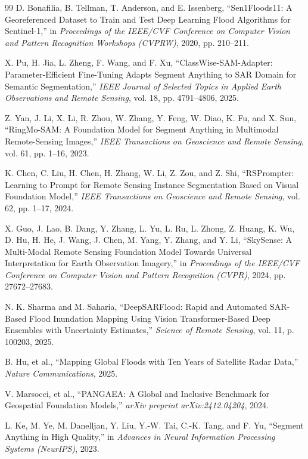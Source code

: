\documentclass[11pt,a4paper,oneside]{report}
\begin{document}
\begin{thebibliography}{99}
D. Bonafilia, B. Tellman, T. Anderson, and E. Issenberg, ``Sen1Floods11: A Georeferenced Dataset to Train and Test Deep Learning Flood Algorithms for Sentinel-1,'' in \emph{Proceedings of the IEEE/CVF Conference on Computer Vision and Pattern Recognition Workshops (CVPRW)}, 2020, pp. 210--211.

X. Pu, H. Jia, L. Zheng, F. Wang, and F. Xu, ``ClassWise-SAM-Adapter: Parameter-Efficient Fine-Tuning Adapts Segment Anything to SAR Domain for Semantic Segmentation,'' \emph{IEEE Journal of Selected Topics in Applied Earth Observations and Remote Sensing}, vol. 18, pp. 4791--4806, 2025.

Z. Yan, J. Li, X. Li, R. Zhou, W. Zhang, Y. Feng, W. Diao, K. Fu, and X. Sun, ``RingMo-SAM: A Foundation Model for Segment Anything in Multimodal Remote-Sensing Images,'' \emph{IEEE Transactions on Geoscience and Remote Sensing}, vol. 61, pp. 1--16, 2023.

K. Chen, C. Liu, H. Chen, H. Zhang, W. Li, Z. Zou, and Z. Shi, ``RSPrompter: Learning to Prompt for Remote Sensing Instance Segmentation Based on Visual Foundation Model,'' \emph{IEEE Transactions on Geoscience and Remote Sensing}, vol. 62, pp. 1--17, 2024.

X. Guo, J. Lao, B. Dang, Y. Zhang, L. Yu, L. Ru, L. Zhong, Z. Huang, K. Wu, D. Hu, H. He, J. Wang, J. Chen, M. Yang, Y. Zhang, and Y. Li, ``SkySense: A Multi-Modal Remote Sensing Foundation Model Towards Universal Interpretation for Earth Observation Imagery,'' in \emph{Proceedings of the IEEE/CVF Conference on Computer Vision and Pattern Recognition (CVPR)}, 2024, pp. 27672--27683.

N. K. Sharma and M. Saharia, ``DeepSARFlood: Rapid and Automated SAR-Based Flood Inundation Mapping Using Vision Transformer-Based Deep Ensembles with Uncertainty Estimates,'' \emph{Science of Remote Sensing}, vol. 11, p. 100203, 2025.

B. Hu, et al., ``Mapping Global Floods with Ten Years of Satellite Radar Data,'' \emph{Nature Communications}, 2025.

V. Marsocci, et al., ``PANGAEA: A Global and Inclusive Benchmark for Geospatial Foundation Models,'' \emph{arXiv preprint arXiv:2412.04204}, 2024.

L. Ke, M. Ye, M. Danelljan, Y. Liu, Y.-W. Tai, C.-K. Tang, and F. Yu, ``Segment Anything in High Quality,'' in \emph{Advances in Neural Information Processing Systems (NeurIPS)}, 2023.


\end{thebibliography}
\end{document}
